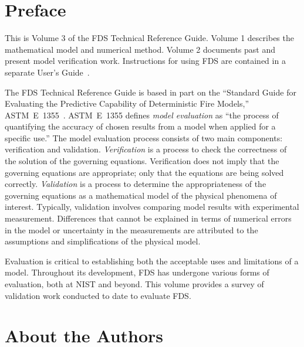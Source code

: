 \documentclass[11pt]{book}
\begin{document}
\pagestyle{plain}


\chapter{Preface}

This is Volume 3 of the FDS Technical Reference Guide. Volume 1 describes the mathematical model and numerical method. Volume 2 documents past and
present model verification work. Instructions for using FDS are contained in a separate User's Guide~\cite{FDS_Users_Guide}.

The FDS Technical Reference Guide is based in part on the ``Standard Guide for Evaluating the Predictive Capability of
Deterministic Fire Models,'' ASTM~E~1355~\cite{ASTM:E1355}. ASTM~E~1355 defines {\em model evaluation} as ``the process of quantifying the accuracy
of chosen results from a model when applied for a specific use.'' The model evaluation process consists of two main components: verification and
validation. {\em Verification} is a process to check the correctness of the solution of the governing equations. Verification does not imply that the
governing equations are appropriate; only that the equations are being solved correctly. {\em Validation} is a process to determine the
appropriateness of the governing equations as a mathematical model of the physical phenomena of interest. Typically, validation involves comparing
model results with experimental measurement. Differences that cannot be explained in terms of numerical errors in the model or uncertainty in the
measurements are attributed to the assumptions and simplifications of the physical model.

Evaluation is critical to establishing both the acceptable uses and limitations of a model. Throughout its development, FDS has undergone various
forms of evaluation, both at NIST and beyond. This volume provides a survey of validation work conducted to date to evaluate FDS.


\chapter{About the Authors}
\end{document}
